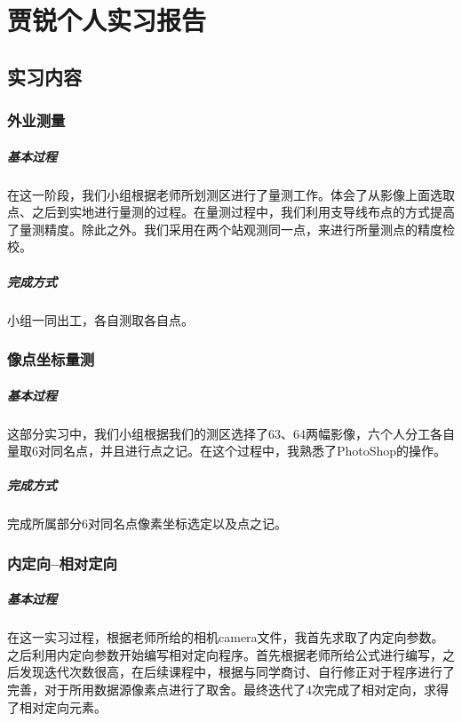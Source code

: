 \chapter{贾锐个人实习报告}

\section{实习内容}

\subsection{外业测量} 

\paragraph{基本过程}

在这一阶段，我们小组根据老师所划测区进行了量测工作。体会了从影像上面选取点、之后到实地进行量测的过程。在量测过程中，我们利用支导线布点的方式提高了量测精度。除此之外。我们采用在两个站观测同一点，来进行所量测点的精度检校。

\paragraph{完成方式} 小组一同出工，各自测取各自点。

\subsection{像点坐标量测} 

\paragraph{基本过程}

这部分实习中，我们小组根据我们的测区选择了63、64两幅影像，六个人分工各自量取6对同名点，并且进行点之记。在这个过程中，我熟悉了PhotoShop的操作。

\paragraph{完成方式} 
完成所属部分6对同名点像素坐标选定以及点之记。

\subsection{内定向--相对定向} 
\paragraph{基本过程}在这一实习过程，根据老师所给的相机camera文件，我首先求取了内定向参数。之后利用内定向参数开始编写相对定向程序。首先根据老师所给公式进行编写，之后发现迭代次数很高，在后续课程中，根据与同学商讨、自行修正对于程序进行了完善，对于所用数据源像素点进行了取舍。最终迭代了4次完成了相对定向，求得了相对定向元素。
